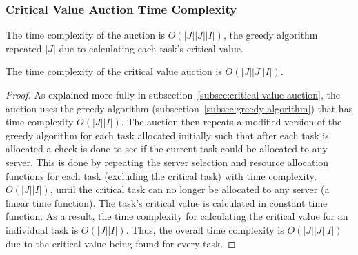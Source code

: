 \subsubsection{Critical Value Auction Time Complexity}
\label{subsubsec:critical-value-auction-time-complexity}
The time complexity of the auction is $O(\left|J\right| \left|J\right| \left|I\right|)$, the greedy
algorithm repeated $\left|J\right|$ due to calculating each task's critical value.
\begin{theorem}
    The time complexity of the critical value auction is $O(\left|J\right| \left|J\right| \left|I\right|)$.
\end{theorem}
\begin{proof}
    As explained more fully in subsection~\ref{subsec:critical-value-auction}, the auction uses the greedy algorithm
    (subsection~\ref{subsec:greedy-algorithm}) that has time complexity $O(\left|J\right| \left|I\right|)$. The
    auction then repeats a modified version of the greedy algorithm for each task allocated initially such that after
    each task is allocated a check is done to see if the current task could be allocated to any server. This is done by
    repeating the server selection and resource allocation functions for each task (excluding the critical task) with
    time complexity, $O(\left|J\right| \left|I\right|)$, until the critical task can no longer be allocated to any
    server (a linear time function). The task's critical value is calculated in constant time function. As a result,
    the time complexity for calculating the critical value for an individual task is $O(\left|J\right| \left|I\right|)$.
    Thus, the overall time complexity is $O(\left|J\right| \left|J\right| \left|I\right|)$ due to the critical value
    being found for every task.
\end{proof}

